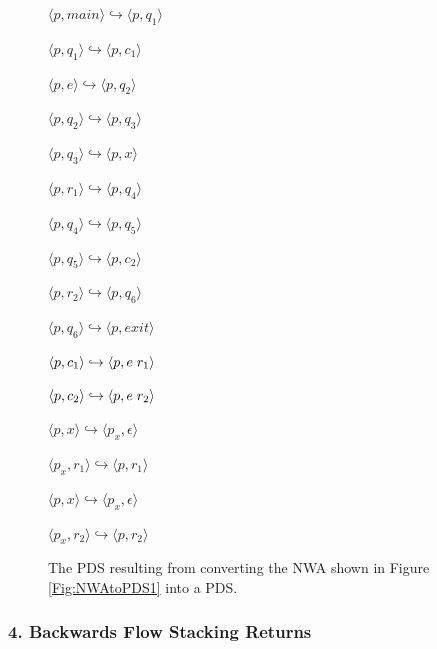 \begin{figure}[htbp]
  \centering
    \begin{description}
      \centering
      \item{ $\langle p,main \rangle \hookrightarrow \langle p,q_1 \rangle$}
      \item{ $\langle p,q_1 \rangle \hookrightarrow \langle p,c_1 \rangle$}
      \item{ $\langle p,e \rangle \hookrightarrow \langle p,q_2 \rangle$}
      \item{ $\langle p,q_2 \rangle \hookrightarrow \langle p,q_3 \rangle$}
      \item{ $\langle p,q_3 \rangle \hookrightarrow \langle p,x \rangle$}
      \item{ $\langle p,r_1 \rangle \hookrightarrow \langle p,q_4 \rangle$}
      \item{ $\langle p,q_4 \rangle \hookrightarrow \langle p,q_5 \rangle$}
      \item{ $\langle p,q_5 \rangle \hookrightarrow \langle p,c_2 \rangle$}
      \item{ $\langle p,r_2 \rangle \hookrightarrow \langle p,q_6 \rangle$}
      \item{ $\langle p,q_6 \rangle \hookrightarrow \langle p,exit \rangle$}
      \item{ $\langle p,c_1 \rangle \hookrightarrow \langle p,e \hspace{.1cm} r_1 \rangle$}
      \item{ $\langle p,c_2 \rangle \hookrightarrow \langle p,e \hspace{.1cm} r_2 \rangle$}
      \item{ $\langle p,x \rangle \hookrightarrow \langle p_x, \epsilon \rangle$}
      \item{ $\langle p_x,r_1 \rangle \hookrightarrow \langle p,r_1 \rangle$}
      \item{ $\langle p,x \rangle \hookrightarrow \langle p_x, \epsilon \rangle$}
      \item{ $\langle p_x,r_2 \rangle \hookrightarrow \langle p,r_2 \rangle$}
    \end{description}
  \caption{The PDS resulting from converting the NWA shown in Figure \ref{Fig:NWAtoPDS1} into a PDS.}
  \label{Fig:NWAtoPDS2}
\end{figure}

\subsubsection{4. Backwards Flow Stacking Returns}

